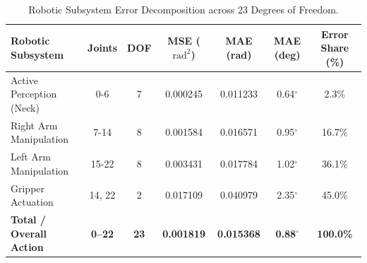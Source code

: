 \begin{table}[t]
\centering
\caption{Robotic Subsystem Error Decomposition across 23 Degrees of Freedom.}
\label{tab:subsystem_breakdown}
\begin{tabular}{lcccccc}
\toprule
\textbf{Robotic Subsystem} & \textbf{Joints} & \textbf{DOF} & \textbf{MSE ($\text{rad}^2$)} & \textbf{MAE (rad)} & \textbf{MAE (deg)} & \textbf{Error Share (\%)} \\
\midrule
Active Perception (Neck) & 0-6 & 7 & 0.000245 & 0.011233 & 0.64$^\circ$ & 2.3\% \\
Right Arm Manipulation & 7-14 & 8 & 0.001584 & 0.016571 & 0.95$^\circ$ & 16.7\% \\
Left Arm Manipulation & 15-22 & 8 & 0.003431 & 0.017784 & 1.02$^\circ$ & 36.1\% \\
Gripper Actuation & 14, 22 & 2 & 0.017109 & 0.040979 & 2.35$^\circ$ & 45.0\% \\
\midrule
\textbf{Total / Overall Action} & \textbf{0--22} & \textbf{23} & \textbf{0.001819} & \textbf{0.015368} & \textbf{0.88$^\circ$} & \textbf{100.0\%} \\
\bottomrule
\end{tabular}
\end{table}
